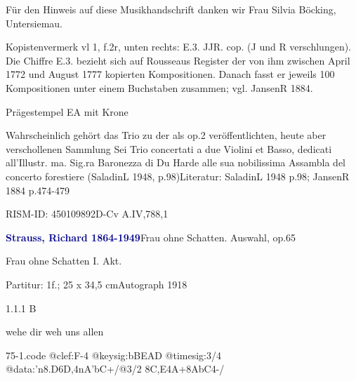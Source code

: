 \documentclass[a4paper, twocolumn, 11pt]{book}
\begin{document}
\newline %
\par Für den Hinweis auf diese Musikhandschrift danken wir Frau Silvia Böcking, Untersiemau.
\par Kopistenvermerk vl 1, f.2r, unten rechts: {\textquotedbl}E.3. JJR. cop.{\textquotedbl} ({\textquotedbl}J{\textquotedbl} und {\textquotedbl}R{\textquotedbl} verschlungen). Die Chiffre {\textquotedbl}E.3.{\textquotedbl} bezieht sich auf Rousseaus Register der von ihm zwischen April 1772 und August 1777 kopierten Kompositionen. Danach fasst er jeweils 100 Kompositionen unter einem Buchstaben zusammen; vgl. JansenR 1884.
\par Prägestempel EA mit Krone
\par Wahrscheinlich gehört das Trio zu der als op.2 veröffentlichten, heute aber verschollenen Sammlung {\textquotedbl}Sei Trio concertati a due Violini et Basso, dedicati all'Illustr. ma. Sig.ra Baronezza di Du Harde alle sua nobilissima Assambla del concerto forestiere{\textquotedbl} (SaladinL 1948, p.98)\newline Literatur: SaladinL 1948  p.98; JansenR 1884  p.474-479
\par RISM-ID: 450109892\newline D-Cv  A.IV,788,1
\par \vspace{16pt} \textcolor{darkblue}{\textbf{Strauss, Richard  1864-1949}}\hfillplus{[75]}\newline Frau ohne Schatten. Auswahl, op.65
\par \begin{itshape} Frau ohne Schatten I. Akt.\end{itshape} 
\par \textcolor{darkblue}{}  Partitur: 1f.; 25 x 34,5 cm\newline Autograph  1918
\par 1.1.1  B\newline \begin{footnotesize} wehe dir weh uns allen \end{footnotesize}  
\begin{filecontents*}{75-1.code}
@clef:F-4
@keysig:bBEAD
@timesig:3/4
@data:'n8.D6D,4nA'bC+/@3/2 8C,E4A+8AbC4-/
\end{filecontents*}
\end{document}

